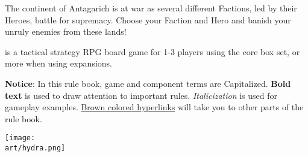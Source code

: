 
\bigbreak

The continent of Antagarich is at war as several different Factions, led by their Heroes, battle for supremacy. Choose your Faction and Hero and banish your unruly enemies from these lands!

 is a tactical strategy RPG board game for 1-3 players using the core box set, or more when using expansions.

\begin{multicols}{2}
\textbf{Notice}: In this rule book, game and component terms are Capitalized.
\textbf{Bold text} is used to draw attention to important rules.
\textit{Italicization} is used for gameplay examples.
\hyperlink{Heroes of Might and Magic III}{Brown colored hyperlinks} will take you to other parts of the rule book.
\phantom{
  
  
  
  
}
\vfill
\columnbreak
{}
\vfill
\end{multicols}

\begin{scaledfigure}[blanker]
  \centering
  \texttt{[image: \\art/hydra.png]}
\end{scaledfigure}
